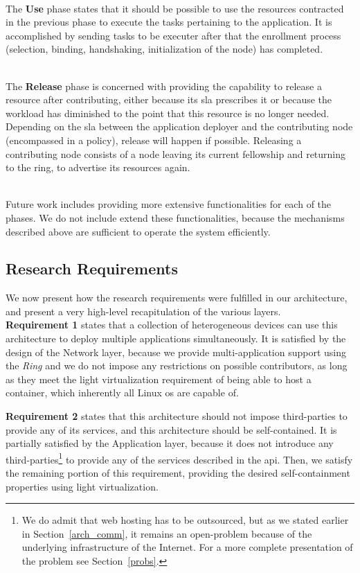 \documentclass[12pt, titlepage]{uo_temp}
\begin{document}
     \\ The \textbf{Use} phase states that it should be possible to use the resources
     contracted in the previous phase to execute the tasks pertaining to the
     application. It is accomplished by sending tasks to be executer after that the
     enrollment process (selection, binding, handshaking, initialization of the node) has
     completed.

     \\ The \textbf{Release} phase is concerned with providing the capability to release a
     resource after contributing, either because its \gls{sla} prescribes it or because
     the workload has diminished to the point that this resource is no longer
     needed. Depending on the \gls{sla} between the application deployer and the
     contributing node (encompassed in a policy), release will happen if
     possible. Releasing a contributing node consists of a node leaving its current
     fellowship and returning to the ring, to advertise its resources again.

     \\ Future work includes providing more extensive functionalities for each of the
     phases. We do not include extend these functionalities, because the mechanisms described
     above are sufficient to operate the system efficiently.

     \subsection{Research Requirements}
     We now present how the research requirements were fulfilled in our architecture, and
     present a very high-level recapitulation of the various layers. \\
     
     \textbf{Requirement 1} states that a collection of heterogeneous devices can use this
     architecture to deploy multiple applications simultaneously. It is satisfied by the
     design of the Network layer, because we provide multi-application support using the
     \emph{Ring} and we do not impose any restrictions on possible contributors, as long
     as they meet the light virtualization requirement of being able to host a container,
     which inherently all Linux \gls{os} are capable of.
     
     \textbf{Requirement 2} states that this architecture should not impose third-parties
     to provide any of its services, and this architecture should be self-contained. It is
     partially satisfied by the Application layer, because it does not introduce any
     third-parties\footnote{We do admit that web hosting has to be outsourced, but as we
       stated earlier in Section~\ref{arch_comm}, it remains an open-problem because of
       the underlying infrastructure of the Internet. For a more complete presentation of
       the problem see Section~\ref{probs}.} to provide any of the services
     described in the \gls{api}. Then, we satisfy the remaining portion of this
     requirement, providing the desired self-containment properties using light
     virtualization.
    
\end{document}
